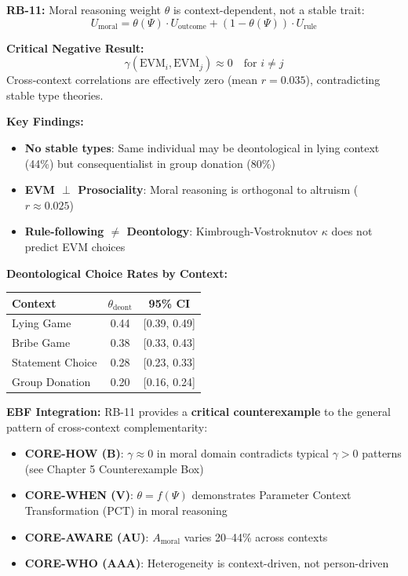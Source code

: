 \begin{axiom}
\label{ax:rb-11}
\textbf{RB-11:} Moral reasoning weight $\theta$ is context-dependent, not a stable trait:
\begin{equation}
U_{\text{moral}} = \theta(\Psi) \cdot U_{\text{outcome}} + (1-\theta(\Psi)) \cdot U_{\text{rule}}
\label{eq:rb-moral-utility}
\end{equation}

\textbf{Critical Negative Result:}
\begin{equation}
\gamma(\text{EVM}_i, \text{EVM}_j) \approx 0 \quad \text{for } i \neq j
\end{equation}
Cross-context correlations are effectively zero (mean $r = 0.035$), contradicting stable type theories.

\textbf{Key Findings:}
\begin{itemize}
    \item \textbf{No stable types}: Same individual may be deontological in lying context (44\%) but consequentialist in group donation (80\%)
    \item \textbf{EVM $\perp$ Prosociality}: Moral reasoning is orthogonal to altruism ($r \approx 0.025$)
    \item \textbf{Rule-following $\neq$ Deontology}: Kimbrough-Vostroknutov $\kappa$ does not predict EVM choices
\end{itemize}
\end{axiom}

\textbf{Deontological Choice Rates by Context:}
\begin{center}
\begin{tabular}{lcc}
\toprule
\textbf{Context} & $\theta_{\text{deont}}$ & 95\% CI \\
\midrule
Lying Game & 0.44 & [0.39, 0.49] \\
Bribe Game & 0.38 & [0.33, 0.43] \\
Statement Choice & 0.28 & [0.23, 0.33] \\
Group Donation & 0.20 & [0.16, 0.24] \\
\bottomrule
\end{tabular}
\end{center}

\textbf{EBF Integration:} RB-11 provides a \textbf{critical counterexample} to the general pattern of cross-context complementarity:
\begin{itemize}
    \item \textbf{CORE-HOW (B)}: $\gamma \approx 0$ in moral domain contradicts typical $\gamma > 0$ patterns (see Chapter 5 Counterexample Box)
    \item \textbf{CORE-WHEN (V)}: $\theta = f(\Psi)$ demonstrates Parameter Context Transformation (PCT) in moral reasoning
    \item \textbf{CORE-AWARE (AU)}: $A_{\text{moral}}$ varies 20--44\% across contexts
    \item \textbf{CORE-WHO (AAA)}: Heterogeneity is context-driven, not person-driven
\end{itemize}

